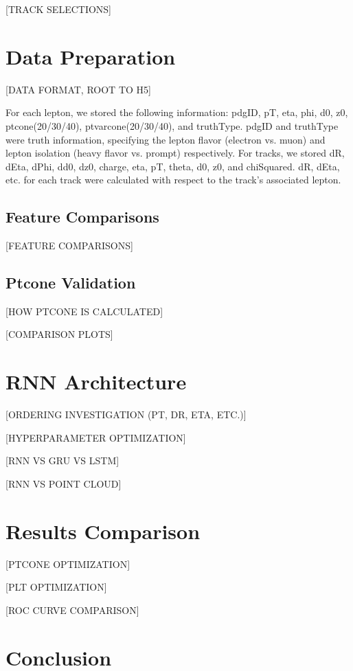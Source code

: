 \documentclass[preprint,12pt]{elsarticle}
\begin{document}
[TRACK SELECTIONS]

\section{Data Preparation}\label{sec:dataprep}

[DATA FORMAT, ROOT TO H5]

For each lepton, we stored the following information: pdgID, pT, eta, phi, d0, z0, ptcone(20/30/40), ptvarcone(20/30/40), and truthType. pdgID and truthType were truth information, specifying the lepton flavor (electron vs. muon) and lepton isolation (heavy flavor vs. prompt) respectively. For tracks, we stored dR, dEta, dPhi, dd0, dz0, charge, eta, pT, theta, d0, z0, and chiSquared. dR, dEta, etc. for each track were calculated with respect to the track's associated lepton.

\subsection{Feature Comparisons}

[FEATURE COMPARISONS]

\subsection{Ptcone Validation}

[HOW PTCONE IS CALCULATED]

[COMPARISON PLOTS]

\section{RNN Architecture}\label{sec:architecture}

[ORDERING INVESTIGATION (PT, DR, ETA, ETC.)]

[HYPERPARAMETER OPTIMIZATION]

[RNN VS GRU VS LSTM]

[RNN VS POINT CLOUD]

\section{Results Comparison}\label{sec:results}

[PTCONE OPTIMIZATION]

[PLT OPTIMIZATION]

[ROC CURVE COMPARISON]

\section{Conclusion}\label{sec:conclusion}



\end{document}
